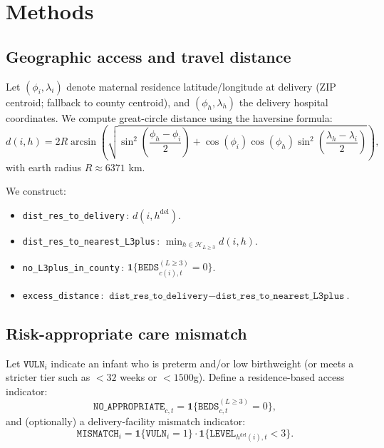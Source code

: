\documentclass[12pt]{article}
\begin{document}
\section{Methods}

\subsection{Geographic access and travel distance}
Let $(\phi_i,\lambda_i)$ denote maternal residence latitude/longitude at delivery (ZIP centroid; fallback to county centroid), and $(\phi_h,\lambda_h)$ the delivery hospital coordinates. We compute great-circle distance using the haversine formula:
\[
d(i,h)=2R\arcsin\left(\sqrt{\sin^2\left(\frac{\phi_h-\phi_i}{2}\right)+
\cos(\phi_i)\cos(\phi_h)\sin^2\left(\frac{\lambda_h-\lambda_i}{2}\right)}\right),
\]
with earth radius $R\approx 6371$ km.

We construct:
\begin{itemize}[leftmargin=*, itemsep=0.25em]
  \item \texttt{dist\_res\_to\_delivery}\,: $d(i,h^{\text{del}})$.
  \item \texttt{dist\_res\_to\_nearest\_L3plus}\,: $\min_{h \in \mathcal{H}_{L\geq 3}} d(i,h)$.
  \item \texttt{no\_L3plus\_in\_county}\,: $\mathbf{1}\{\texttt{BEDS}_{c(i),t}^{(L\geq 3)}=0\}$.
  \item \texttt{excess\_distance}\,: $\texttt{dist\_res\_to\_delivery}-\texttt{dist\_res\_to\_nearest\_L3plus}$.
\end{itemize}

\subsection{Risk-appropriate care mismatch}
Let $\texttt{VULN}_i$ indicate an infant who is preterm and/or low birthweight (or meets a stricter tier such as $<32$ weeks or $<1500$g). Define a residence-based access indicator:
\[
\texttt{NO\_APPROPRIATE}_{c,t} = \mathbf{1}\{\texttt{BEDS}_{c,t}^{(L\geq 3)}=0\},
\]
and (optionally) a delivery-facility mismatch indicator:
\[
\texttt{MISMATCH}_i=\mathbf{1}\{\texttt{VULN}_i=1\}\cdot \mathbf{1}\{\texttt{LEVEL}_{h^{\text{del}}(i),t}<3\}.
\]
\end{document}
